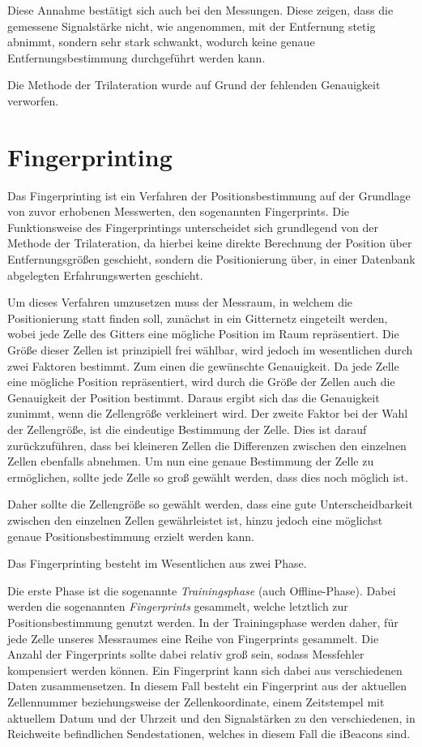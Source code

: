 Diese Annahme bestätigt sich auch bei den Messungen. Diese zeigen, dass die gemessene Signalstärke nicht, wie angenommen, mit der Entfernung stetig abnimmt, sondern sehr stark schwankt, wodurch keine genaue Entfernungsbestimmung durchgeführt werden kann.

Die Methode der Trilateration wurde auf Grund der fehlenden Genauigkeit verworfen. 

\section{Fingerprinting}
\label{sec:implementation:fingerprinting}
Das Fingerprinting ist ein Verfahren der Positionsbestimmung auf der Grundlage von zuvor erhobenen Messwerten, den sogenannten Fingerprints.
Die Funktionsweise des Fingerprintings unterscheidet sich grundlegend von der Methode der Trilateration, da hierbei keine direkte Berechnung der Position über Entfernungsgrößen geschieht, sondern die Positionierung über, in einer Datenbank abgelegten Erfahrungswerten geschieht.

Um dieses Verfahren umzusetzen muss der Messraum, in welchem die Positionierung statt finden soll, zunächst in ein Gitternetz eingeteilt werden, wobei jede Zelle des Gitters eine mögliche Position im Raum repräsentiert. Die Größe dieser Zellen ist prinzipiell frei wählbar, wird jedoch im wesentlichen durch zwei Faktoren bestimmt. 
Zum einen die gewünschte Genauigkeit. Da jede Zelle eine mögliche Position repräsentiert, wird durch die Größe der Zellen auch die Genauigkeit der Position bestimmt. Daraus ergibt sich das die Genauigkeit zunimmt, wenn die Zellengröße verkleinert wird.
Der zweite Faktor bei der Wahl der Zellengröße, ist die eindeutige Bestimmung der Zelle. Dies ist darauf zurückzuführen, dass bei kleineren Zellen die Differenzen zwischen den einzelnen Zellen ebenfalls abnehmen. Um nun eine genaue Bestimmung der Zelle zu ermöglichen, sollte jede Zelle so groß gewählt werden, dass dies noch möglich ist.

Daher sollte die Zellengröße so gewählt werden, dass eine gute Unterscheidbarkeit zwischen den einzelnen Zellen gewährleistet ist, hinzu jedoch eine möglichst genaue Positionsbestimmung erzielt werden kann.


Das Fingerprinting besteht im Wesentlichen aus zwei Phase.

Die erste Phase ist die sogenannte \emph{Trainingsphase} (auch Offline-Phase). Dabei werden die sogenannten \emph{Fingerprints} gesammelt, welche letztlich zur Positionsbestimmung genutzt werden. 
In der Trainingsphase werden daher, für jede Zelle unseres Messraumes eine Reihe von Fingerprints gesammelt. Die Anzahl der Fingerprints sollte dabei relativ groß sein, sodass Messfehler kompensiert werden können. 
Ein Fingerprint kann sich dabei aus verschiedenen Daten zusammensetzen. 
In diesem Fall besteht ein Fingerprint aus der aktuellen Zellennummer beziehungsweise der Zellenkoordinate, einem Zeitstempel mit aktuellem Datum und der Uhrzeit und den Signalstärken zu den verschiedenen, in Reichweite befindlichen Sendestationen, welches in diesem Fall die iBeacons sind.

